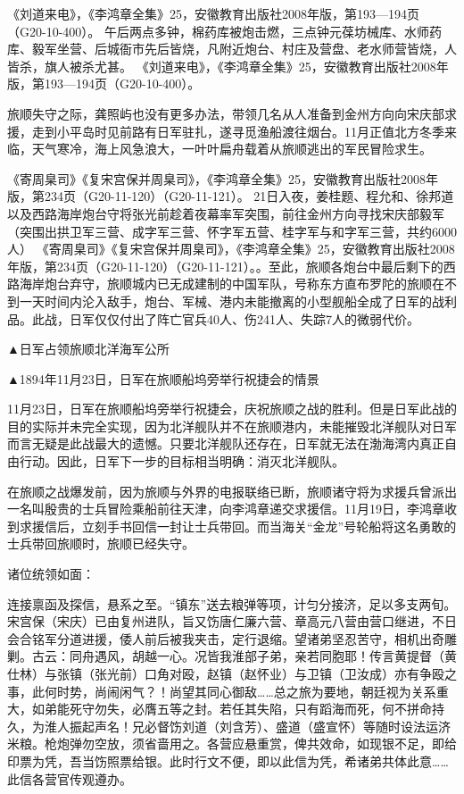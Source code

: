 \documentclass[12pt,UTF8]{ctexbook}
\begin{document}
《刘道来电》，《李鸿章全集》25，安徽教育出版社2008年版，第193—194页（G20-10-400）。
午后两点多钟，棉药库被炮击燃，三点钟元葆坊械库、水师药库、毅军坐营、后城衙市先后皆烧，凡附近炮台、村庄及营盘、老水师营皆烧，人皆杀，旗人被杀尤甚。 《刘道来电》，《李鸿章全集》25，安徽教育出版社2008年版，第193—194页（G20-10-400）。

旅顺失守之际，龚照屿也没有更多办法，带领几名从人准备到金州方向向宋庆部求援，走到小平岛时见前路有日军驻扎，遂寻觅渔船渡往烟台。11月正值北方冬季来临，天气寒冷，海上风急浪大，一叶叶扁舟载着从旅顺逃出的军民冒险求生。

《寄周臬司》《复宋宫保并周臬司》，《李鸿章全集》25，安徽教育出版社2008年版，第234页（G20-11-120）（G20-11-121）。
21日入夜，姜桂题、程允和、徐邦道以及西路海岸炮台守将张光前趁着夜幕率军突围，前往金州方向寻找宋庆部毅军（突围出拱卫军三营、成字军三营、怀字军五营、桂字军与和字军三营，共约6000人） 《寄周臬司》《复宋宫保并周臬司》，《李鸿章全集》25，安徽教育出版社2008年版，第234页（G20-11-120）（G20-11-121）。。至此，旅顺各炮台中最后剩下的西路海岸炮台弃守，旅顺城内已无成建制的中国军队，号称东方直布罗陀的旅顺在不到一天时间内沦入敌手，炮台、军械、港内未能撤离的小型舰船全成了日军的战利品。此战，日军仅仅付出了阵亡官兵40人、伤241人、失踪7人的微弱代价。


▲日军占领旅顺北洋海军公所


▲1894年11月23日，日军在旅顺船坞旁举行祝捷会的情景

11月23日，日军在旅顺船坞旁举行祝捷会，庆祝旅顺之战的胜利。但是日军此战的目的实际并未完全实现，因为北洋舰队并不在旅顺港内，未能摧毁北洋舰队对日军而言无疑是此战最大的遗憾。只要北洋舰队还存在，日军就无法在渤海湾内真正自由行动。因此，日军下一步的目标相当明确：消灭北洋舰队。

在旅顺之战爆发前，因为旅顺与外界的电报联络已断，旅顺诸守将为求援兵曾派出一名叫殷贵的士兵冒险乘船前往天津，向李鸿章递交求援信。11月19日，李鸿章收到求援信后，立刻手书回信一封让士兵带回。而当海关“金龙”号轮船将这名勇敢的士兵带回旅顺时，旅顺已经失守。

诸位统领如面：

连接禀函及探信，悬系之至。“镇东”送去粮弹等项，计匀分接济，足以多支两旬。宋宫保（宋庆）已由复州进队，旨又饬唐仁廉六营、章高元八营由营口继进，不日会合铭军分道进援，倭人前后被我夹击，定行退缩。望诸弟坚忍苦守，相机出奇雕剿。古云：同舟遇风，胡越一心。况皆我淮部子弟，亲若同胞耶！传言黄提督（黄仕林）与张镇（张光前）口角对殴，赵镇（赵怀业）与卫镇（卫汝成）亦有争殴之事，此何时势，尚闹闲气？！尚望其同心御敌……总之旅为要地，朝廷视为关系重大，如弟能死守勿失，必膺五等之封。若任其失陷，只有蹈海而死，何不拼命持久，为淮人振起声名！兄必督饬刘道（刘含芳）、盛道（盛宣怀）等随时设法运济米粮。枪炮弹勿空放，须省啬用之。各营应悬重赏，俾共效命，如现银不足，即给印票为凭，吾当饬照票给银。此时行文不便，即以此信为凭，希诸弟共体此意……此信各营官传观遵办。
\end{document}
